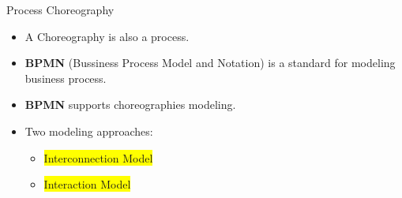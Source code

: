 \documentclass[xcolor=svgnames]{beamer}
\begin{document}



  \begin{frame}{Process Choreography}
    \begin{itemize}
      \item <1-> A Choreography is also a process.
      \item <2-> \textbf{BPMN} (Bussiness Process Model and Notation) is a standard for modeling business process.
      \item <2-> \textbf{BPMN} supports choreographies modeling.
      \item <3-> Two modeling approaches:
	\begin{itemize}
	  \item <3-> \colorbox{yellow}{Interconnection Model}%
	  \item <4-> \colorbox{yellow}{Interaction Model}%
	\end{itemize}
    \end{itemize}

  \end{frame}
\end{document}
